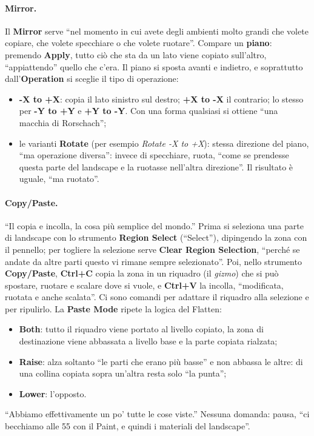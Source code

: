 \paragraph{Mirror.} Il \textbf{Mirror} serve ``nel momento in cui avete degli ambienti molto
grandi che volete copiare, che volete specchiare o che volete ruotare''. Compare un
\textbf{piano}: premendo \textbf{Apply}, tutto ciò che sta da un lato viene copiato
sull'altro, ``appiattendo'' quello che c'era. Il piano si sposta avanti e indietro, e
soprattutto dall'\textbf{Operation} si sceglie il tipo di operazione:
\begin{itemize}
  \item \textbf{-X to +X}: copia il lato sinistro sul destro; \textbf{+X to -X} il contrario;
        lo stesso per \textbf{-Y to +Y} e \textbf{+Y to -Y}. Con una forma qualsiasi si ottiene
        ``una macchia di Rorschach'';
  \item le varianti \textbf{Rotate} (per esempio \emph{Rotate -X to +X}): stessa direzione del
        piano, ``ma operazione diversa'': invece di specchiare, ruota, ``come se prendesse
        questa parte del landscape e la ruotasse nell'altra direzione''. Il risultato è
        uguale, ``ma ruotato''.
\end{itemize}

\paragraph{Copy/Paste.} ``Il copia e incolla, la cosa più semplice del mondo.'' Prima si
seleziona una parte di landscape con lo strumento \textbf{Region Select} (``Select''),
dipingendo la zona con il pennello; per togliere la selezione serve \textbf{Clear Region
Selection}, ``perché se andate da altre parti questo vi rimane sempre selezionato''. Poi,
nello strumento \textbf{Copy/Paste}, \textbf{Ctrl+C} copia la zona in un riquadro (il
\emph{gizmo}) che si può spostare, ruotare e scalare dove si vuole, e \textbf{Ctrl+V} la
incolla, ``modificata, ruotata e anche scalata''. Ci sono comandi per adattare il riquadro
alla selezione e per ripulirlo. La \textbf{Paste Mode} ripete la logica del Flatten:
\begin{itemize}
  \item \textbf{Both}: tutto il riquadro viene portato al livello copiato, la zona di
        destinazione viene abbassata a livello base e la parte copiata rialzata;
  \item \textbf{Raise}: alza soltanto ``le parti che erano più basse'' e non abbassa le altre:
        di una collina copiata sopra un'altra resta solo ``la punta'';
  \item \textbf{Lower}: l'opposto.
\end{itemize}
``Abbiamo effettivamente un po' tutte le cose viste.'' Nessuna domanda: pausa, ``ci becchiamo
alle 55 con il Paint, e quindi i materiali del landscape''.

